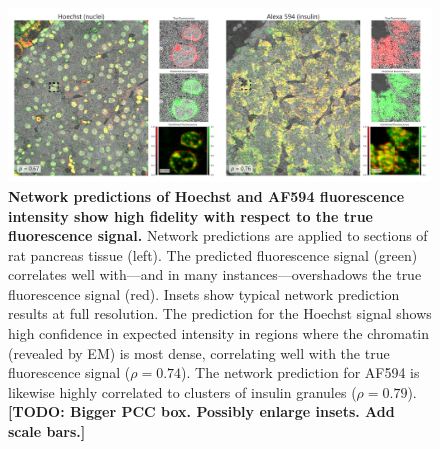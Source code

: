 \begin{figure}[!tbh]
    \centering
    \includegraphics[width=\linewidth]{chapter-4/figures/fig2_pancreas_v11.pdf}
    \caption{\textbf{Network predictions of Hoechst and AF594 fluorescence intensity show high fidelity with respect to the true fluorescence signal.}
    Network predictions are applied to sections of rat pancreas tissue (left). The predicted fluorescence signal (green) correlates well with---and in many instances---overshadows the true fluorescence signal (red).
    Insets show typical network prediction results at full resolution.
    The prediction for the Hoechst signal shows high confidence in expected intensity in regions where the chromatin (revealed by EM) is most dense, correlating well with the true fluorescence signal ($\rho=0.74$).
    The network prediction for AF594 is likewise highly correlated to clusters of insulin granules ($\rho=0.79$).
    \textbf{[TODO: Bigger PCC box. Possibly enlarge insets. Add scale bars.]}}
    \label{fig:4.2_pancreas}
\end{figure}



